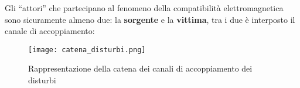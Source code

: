 Gli ``attori'' che partecipano al fenomeno della compatibilità elettromagnetica sono sicuramente
almeno due: la \textbf{sorgente} e la \textbf{vittima}, tra i due è interposto il canale di accoppiamento:

\begin{figure}[h]
 \texttt{[image: catena\_disturbi.png]}
 \centering
 \caption{Rappresentazione della catena dei canali di accoppiamento dei disturbi}
 \label{fig:catena_disturbi}
\end{figure}



